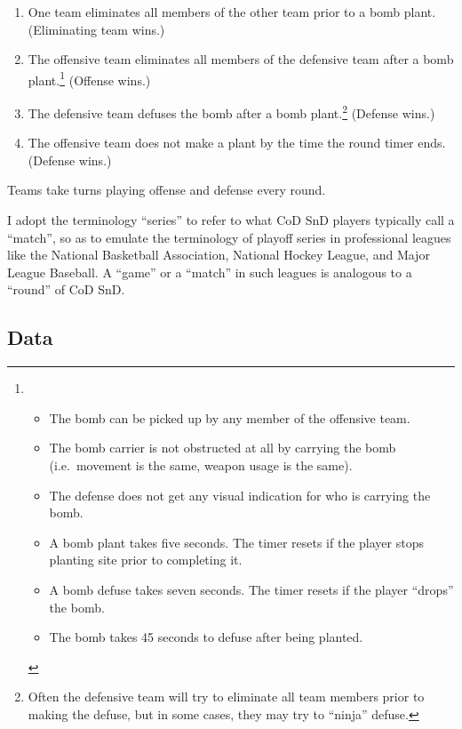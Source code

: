 \documentclass{article}
\providecommand{\tightlist}{%
  \setlength{\itemsep}{0pt}\setlength{\parskip}{0pt}}
\begin{document}
\begin{enumerate}
\def\labelenumi{\arabic{enumi}.}
\tightlist
\item
  One team eliminates all members of the other team prior to a bomb
  plant. (Eliminating team wins.)
\item
  The offensive team eliminates all members of the defensive team after
  a bomb plant.\footnote{\begin{itemize}
    \tightlist
    \item
      The bomb can be picked up by any member of the offensive team.
    \item
      The bomb carrier is not obstructed at all by carrying the bomb
      (i.e.~movement is the same, weapon usage is the same).
    \item
      The defense does not get any visual indication for who is carrying
      the bomb.
    \item
      A bomb plant takes five seconds. The timer resets if the player
      stops planting site prior to completing it.
    \item
      A bomb defuse takes seven seconds. The timer resets if the player
      ``drops'' the bomb.
    \item
      The bomb takes 45 seconds to defuse after being planted.
    \end{itemize}} (Offense wins.)
\item
  The defensive team defuses the bomb after a bomb plant.\footnote{Often
    the defensive team will try to eliminate all team members prior to
    making the defuse, but in some cases, they may try to ``ninja''
    defuse.} (Defense wins.)
\item
  The offensive team does not make a plant by the time the round timer
  ends. (Defense wins.)
\end{enumerate}

Teams take turns playing offense and defense every round.

I adopt the terminology ``series'' to refer to what CoD SnD players
typically call a ``match'', so as to emulate the terminology of playoff
series in professional leagues like the National Basketball Association,
National Hockey League, and Major League Baseball. A ``game'' or a
``match'' in such leagues is analogous to a ``round'' of CoD SnD.

\hypertarget{data}{%
\subsection{Data}\label{data}}
\end{document}
